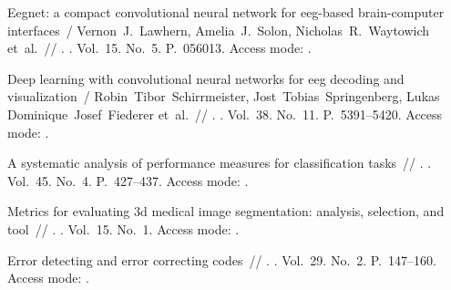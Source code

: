 \expandafter\long\expandafter\gdef\csname fullcite@10.1088/1741-2552/aace8c\endcsname{%
Eegnet: a compact convolutional neural network for eeg-based brain-computer
  interfaces~/ Vernon~J.~Lawhern, Amelia~J.~Solon, Nicholas~R.~Waytowich
  et~al.~// \href{http://dx.doi.org/10.1088/1741-2552/aace8c}{}. \BibDash
{}. \BibDash
\newblock Vol.~15. No.~5. \BibDash
\newblock P.~056013. \BibDash
\newblock Access mode: .
}

\expandafter\long\expandafter\gdef\csname fullcite@10.1002/hbm.23730\endcsname{%
Deep learning with convolutional neural networks for eeg decoding and
  visualization~/ Robin~Tibor~Schirrmeister, Jost~Tobias~Springenberg, Lukas
  Dominique~Josef~Fiederer et~al.~//
  \href{http://dx.doi.org/10.1002/hbm.23730}{}.
  \BibDash
{}. \BibDash
\newblock Vol.~38. No.~11. \BibDash
\newblock P.~5391--5420. \BibDash
\newblock Access mode: .
}

\expandafter\long\expandafter\gdef\csname fullcite@10.1016/j.ipm.2009.03.002\endcsname{%
 A systematic analysis of performance measures
  for classification tasks~//
  \href{http://dx.doi.org/10.1016/j.ipm.2009.03.002}{}. \BibDash
{}. \BibDash
\newblock Vol.~45. No.~4. \BibDash
\newblock P.~427--437. \BibDash
\newblock Access mode: .
}

\expandafter\long\expandafter\gdef\csname fullcite@10.1186/s12880-015-0068-x\endcsname{%
 Metrics for evaluating 3d medical image
  segmentation: analysis, selection, and tool~//
  \href{http://dx.doi.org/10.1186/s12880-015-0068-x}{}. \BibDash
{}. \BibDash
\newblock Vol.~15. No.~1. \BibDash
\newblock Access mode: .
}

\expandafter\long\expandafter\gdef\csname fullcite@10.1002/j.1538-7305.1950.tb00463.x\endcsname{%
 Error detecting and error correcting codes~//
  \href{http://dx.doi.org/10.1002/j.1538-7305.1950.tb00463.x}{}. \BibDash
{}. \BibDash
\newblock Vol.~29. No.~2. \BibDash
\newblock P.~147--160. \BibDash
\newblock Access mode:
  .
}

\makeatother
